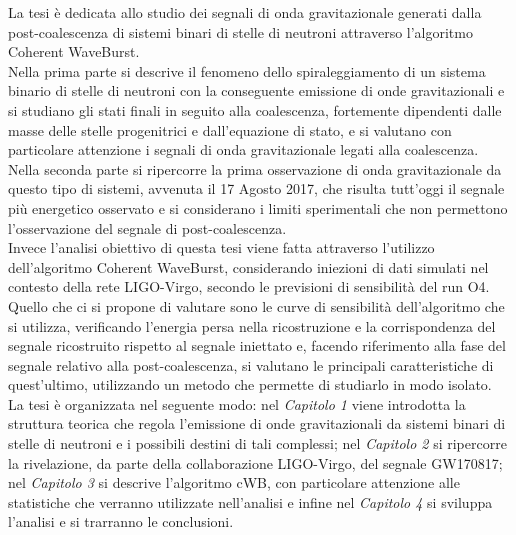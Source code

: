 \tableofcontents
\newpage
\thispagestyle{plain}
\begin{Abstract}
	\begin{changemargin}{1cm}{1cm}
		La tesi è dedicata allo studio dei segnali di onda gravitazionale generati dalla post-coalescenza di sistemi binari di stelle di neutroni attraverso l'algoritmo Coherent WaveBurst.\\
		Nella prima parte si descrive il fenomeno dello spiraleggiamento di un sistema binario di stelle di neutroni con la conseguente emissione di onde gravitazionali e si studiano gli stati finali in seguito alla coalescenza, fortemente dipendenti dalle masse delle stelle progenitrici e dall'equazione di stato, e si valutano con particolare attenzione i segnali di onda gravitazionale legati alla coalescenza. Nella seconda parte si ripercorre la prima osservazione di onda gravitazionale da questo tipo di sistemi, avvenuta il 17 Agosto 2017, che risulta tutt'oggi il segnale più energetico osservato e si considerano i limiti sperimentali che non permettono l'osservazione del segnale di post-coalescenza. \\
		Invece l'analisi obiettivo di questa tesi viene fatta attraverso l'utilizzo dell'algoritmo Coherent WaveBurst, considerando iniezioni di dati simulati nel contesto della rete LIGO-Virgo, secondo le previsioni di sensibilità del run O4. Quello che ci si propone di valutare sono le curve di sensibilità dell'algoritmo che si utilizza, verificando l'energia persa nella ricostruzione e la corrispondenza del segnale ricostruito rispetto al segnale iniettato e, facendo riferimento alla fase del segnale relativo alla post-coalescenza, si valutano le principali caratteristiche di quest'ultimo, utilizzando un metodo che permette di studiarlo in modo isolato. \\
		La tesi è organizzata nel seguente modo: nel \textit{Capitolo 1} viene introdotta la struttura teorica che regola l'emissione di onde gravitazionali da sistemi binari di stelle di neutroni e i possibili destini di tali complessi; nel \textit{Capitolo 2} si ripercorre la rivelazione, da parte della collaborazione LIGO-Virgo, del segnale GW170817; nel \textit{Capitolo 3} si descrive l'algoritmo cWB, con particolare attenzione alle statistiche che verranno utilizzate nell'analisi e infine nel \textit{Capitolo 4} si sviluppa l'analisi e si trarranno le conclusioni.
	\end{changemargin}
\end{Abstract}

